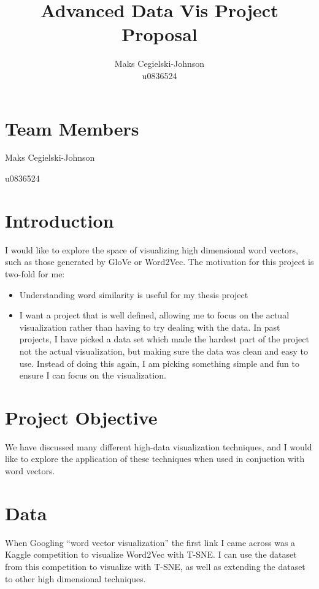 \documentclass{article}
\title{Advanced Data Vis Project Proposal}
\author{Maks Cegielski-Johnson\\u0836524}
\begin{document}
\maketitle
\section{Team Members}

Maks Cegielski-Johnson

u0836524

\section{Introduction}

I would like to explore the space of visualizing high dimensional word vectors, such as those generated by GloVe or Word2Vec. The motivation for this project is two-fold for me: 

\begin{itemize}
\item Understanding word similarity is useful for my thesis project
\item I want a project that is well defined, allowing me to focus on the actual visualization rather than having to try dealing with the data. In past projects, I have picked a data set which made the hardest part of the project not the actual visualization, but making sure the data was clean and easy to use. Instead of doing this again, I am picking something simple and fun to ensure I can focus on the visualization. 
\end{itemize}




\section{Project Objective}

We have discussed many different high-data visualization techniques, and I would like to explore the application of these techniques when used in conjuction with word vectors. 

\section{Data}

When Googling ``word vector visualization'' the first link I came across was a Kaggle competition to visualize Word2Vec with T-SNE. I can use the dataset from this competition to visualize with T-SNE, as well as extending the dataset to other high dimensional techniques. 
\end{document}
